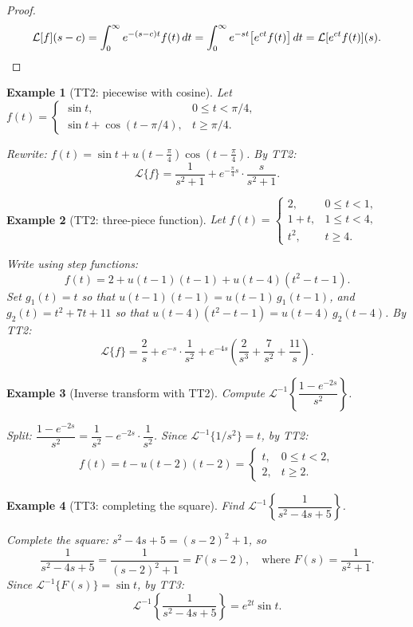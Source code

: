 \documentclass{article}
\newtheorem*{example}{Example}
\newcommand{\Lap}{\mathcal{L}}
\newcommand{\Linv}{\mathcal{L}^{-1}}
\begin{document}
\begin{proof}
    \[\Lap[f](s-c) = \int_0^\infty e^{-(s-c)t}f(t)\,dt = \int_0^\infty e^{-st}\bigl[e^{ct}f(t)\bigr]\,dt = \Lap[e^{ct}f(t)](s). \qedhere\]
\end{proof}

\begin{example}[TT2: piecewise with cosine]
    Let $f(t) = \begin{cases}\sin t, & 0\leq t < \pi/4,\\ \sin t + \cos(t - \pi/4), & t\geq\pi/4.\end{cases}$

    Rewrite: $f(t) = \sin t + u(t - \tfrac{\pi}{4})\cos(t - \tfrac{\pi}{4})$. By TT2:
    \[\Lap\{f\} = \frac{1}{s^2+1} + e^{-\frac{\pi}{4}s}\cdot\frac{s}{s^2+1}.\]
\end{example}

\begin{example}[TT2: three-piece function]
    Let $f(t) = \begin{cases}2, & 0\leq t<1,\\ 1+t, & 1\leq t<4,\\ t^2, & t\geq 4.\end{cases}$

    Write using step functions:
    \[f(t) = 2 + u(t-1)(t-1) + u(t-4)(t^2-t-1).\]
    Set $g_1(t) = t$ so that $u(t-1)(t-1) = u(t-1)\,g_1(t-1)$, and $g_2(t) = t^2 + 7t + 11$ so that $u(t-4)(t^2-t-1) = u(t-4)\,g_2(t-4)$. By TT2:
    \[\Lap\{f\} = \frac{2}{s} + e^{-s}\cdot\frac{1}{s^2} + e^{-4s}\left(\frac{2}{s^3} + \frac{7}{s^2} + \frac{11}{s}\right).\]
\end{example}

\begin{example}[Inverse transform with TT2]
    Compute $\Linv\!\left\{\dfrac{1-e^{-2s}}{s^2}\right\}$.

    Split: $\dfrac{1-e^{-2s}}{s^2} = \dfrac{1}{s^2} - e^{-2s}\cdot\dfrac{1}{s^2}$. Since $\Linv\{1/s^2\} = t$, by TT2:
    \[f(t) = t - u(t-2)(t-2) = \begin{cases}t, & 0\leq t<2,\\ 2, & t\geq 2.\end{cases}\]
\end{example}

\begin{example}[TT3: completing the square]
    Find $\Linv\!\left\{\dfrac{1}{s^2-4s+5}\right\}$.

    Complete the square: $s^2-4s+5 = (s-2)^2+1$, so
    \[\frac{1}{s^2-4s+5} = \frac{1}{(s-2)^2+1} = F(s-2),\quad\text{where } F(s) = \frac{1}{s^2+1}.\]
    Since $\Linv\{F(s)\} = \sin t$, by TT3:
    \[\Linv\!\left\{\frac{1}{s^2-4s+5}\right\} = e^{2t}\sin t.\]
\end{example}
\end{document}
